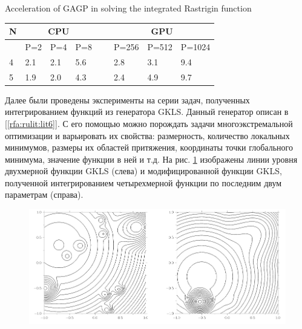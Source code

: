 \documentclass[10pt,a4paper]{book}
\begin{document}
\begin{table}[!ht]
    \centering
             {Acceleration of GAGP in solving the integrated Rastrigin function}
    \label{table2}
    \begin{tabular}{|l|l|l|l|l|l|l|l|}
    \hline
        N &\multicolumn{3}{c|}{CPU} & ~ & \multicolumn{3}{c|}{GPU} \\ \hline
        ~ & P=2 & P=4 & P=8 & ~ & P=256 & P=512 & P=1024  \\ \hline
        4 & 2.1 & 2.1 & 5.6 & ~ & 2.8 & 3.1 & 9.4  \\ \hline
        5 & 1.9 & 2.0 & 4.3 & ~ & 2.4 & 4.9 & 9.7  \\ \hline
    \end{tabular}
\end{table}

Далее были проведены эксперименты на серии задач, полученных интегрированием функций из генератора GKLS. Данный генератор описан в [\ref{rfa:rulit:lit6}]. С его помощью можно порождать задачи многоэкстремальной оптимизации и варьировать их свойства: размерность, количество локальных минимумов, размеры их областей притяжения, координаты точки глобального минимума, значение функции в ней и т.д. На рис. \ref{fig:s3} изображены линии уровня двухмерной функции GKLS (слева) и модифицированной функции GKLS, полученной интегрированием четырехмерной функции по последним двум параметрам (справа).

\begin{figure}
\begin{center}
  \includegraphics[width=1.0\linewidth]{./pic/s3.png}
  \label{fig:s3}  
\end{center}
\end{figure}
\end{document}
